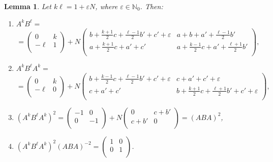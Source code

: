 \documentclass[10pt]{amsart}
\theoremstyle{plain}
\newtheorem{lemma}[theorem]{Lemma}
\theoremstyle{definition}
\theoremstyle{remark}%
\newcommand{\N}{\mathbb{N}}
\newcommand{\mat}[4]{\left(\begin{array}{cc}
 #1 & #2\\
 #3 & #4\\
\end{array}\right)}
\begin{document}
\begin{lemma}\label{10.2}
Let $k\ell=1+\varepsilon N$, where $\varepsilon\in\N_0$. Then:
\begin{enumerate}
\item[(i)] $A^k B^{\ell}=$
$$=\mat{0}{k}{-\ell}{1}+
 N\mat{b+\frac{k+1}{2}c+\frac{\ell-1}{2}b'+c'+\varepsilon}{a+b+a'+\frac{\ell-1}{2}b'}{a+\frac{k+1}{2}c+a'+c'}{a+\frac{k-1}{2}c+a'+\frac{\ell+1}{2}b'},$$

\item[(ii)] $A^k B^{\ell}A^k=$
 $$=\mat{0}{k}{-\ell}{0}+
 N\mat{b+\frac{k-1}{2}c+\frac{\ell-1}{2}b'+c'+\varepsilon}{c+a'+c'+\varepsilon}{c+a'+c'}{b+\frac{k+1}{2}c+\frac{\ell+1}{2}b'+c'+\varepsilon},$$
 \item[(iii)] $(A^k B^{\ell}A^k)^2=\mat{-1}{0}{0}{-1}+
 N\mat{0}{c+b'}{c+b'}{0}=(ABA)^2$,
    
\item[(iv)] $(A^k B^{\ell}A^k)^2(ABA)^{-2}=\mat{1}{0}{0}{1}$.
\end{enumerate}
\end{lemma}
\end{document}
